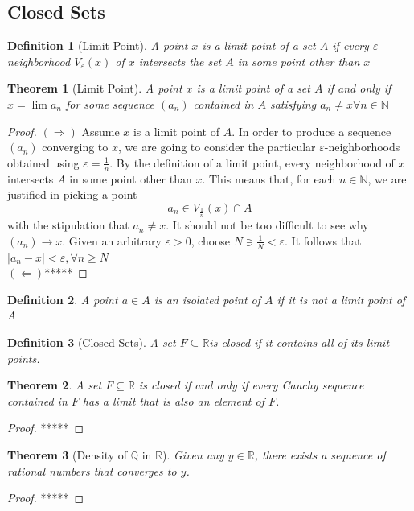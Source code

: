\documentclass[10pt]{report}
\newtheorem{thm3}{Theorem}[subsection]
\newtheorem{def3}{Definition}[subsection]
\newcommand{\eps}{\varepsilon}
\begin{document}
\subsection{Closed Sets}
\begin{def3}[Limit Point]
A point $x$ is a limit point of a set $A$ if every $\eps$-neighborhood $V_\eps(x)$ of $x$ intersects the set $A$ in some point other than $x$
\end{def3}
\begin{thm3}[Limit Point]
A point $x$ is a limit point of a set $A$ if and only if $x=\lim a_n$ for some sequence $(a_n)$ contained in $A$ satisfying $a_n\neq x\forall n\in \mathbb{N}$
\end{thm3}
\begin{proof}
$(\Rightarrow)$ Assume $x$ is a limit point of $A$. In order to produce a sequence $(a_n)$ converging to $x$, we are going to consider the particular $\eps$-neighborhoods obtained using $\eps = \frac{1}{n}$. By the definition of a limit point, every neighborhood of $x$ intersects $A$ in some point other than $x$. This means that, for each $n\in\mathbb{N}$, we are justified in picking a point
$$a_n\in V_\frac{1}{n}(x)\cap A$$
with the stipulation that $a_n\neq x$. It should not be too difficult to see why $(a_n)\to x$. Given an arbitrary $\eps>0$, choose $N\ni \frac{1}{N}<\eps$. It follows that $|a_n-x|<\eps,\forall n\geq N$\\
$(\Leftarrow)$*****
\end{proof}
\begin{def3}
A point $a\in A$ is an isolated point of $A$ if it is not a limit point of $A$
\end{def3}
\begin{def3}[Closed Sets]
A set $F\subseteq \mathbb{R}$is closed if it contains all of its limit points.
\end{def3}
\begin{thm3}A set $F\subseteq \mathbb{R}$ is closed if and only if every Cauchy sequence contained in $F$ has a limit that is also an element of $F$.
\end{thm3}
\begin{proof}
*****
\end{proof}
\begin{thm3}[Density of $\mathbb{Q}$ in $\mathbb{R}$]
Given any $y\in\mathbb{R}$, there exists a sequence of rational numbers that converges to $y$.
\end{thm3}
\begin{proof}
*****
\end{proof}
\end{document}
